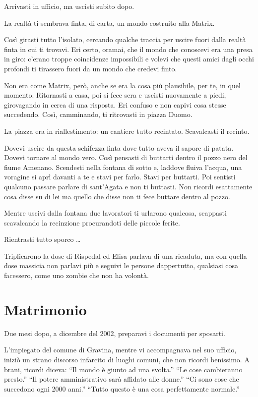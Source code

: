 Arrivasti in ufficio, ma uscisti subito dopo.

La realtà ti sembrava finta, di carta, un mondo costruito alla Matrix.

Così girasti tutto l'isolato, cercando qualche traccia per uscire fuori dalla realtà finta in cui ti trovavi. Eri certo, oramai, che il mondo che conoscevi era una presa in giro: c'erano troppe coincidenze impossibili e volevi che questi amici dagli occhi profondi ti tirassero fuori da un mondo che credevi finto.

Non era come Matrix, però, anche se era la cosa più plausibile, per te, in quel momento. Ritornasti a casa, poi si fece sera e uscisti nuovamente a piedi, girovagando in cerca di una risposta. Eri confuso e non capivi cosa stesse succedendo. Così, camminando, ti ritrovasti in piazza Duomo.

La piazza era in riallestimento: un cantiere tutto recintato. Scavalcasti il recinto.

Dovevi uscire da questa schifezza finta dove tutto aveva il sapore di patata. Dovevi tornare al mondo vero. Così pensasti di buttarti dentro il pozzo nero del fiume Amenano. Scendesti nella fontana di sotto e, laddove fluiva l'acqua, una voragine si aprì davanti a te e stavi per farlo. Stavi per buttarti. Poi sentisti qualcuno passare parlare di sant'Agata e non ti buttasti. Non ricordi esattamente cosa disse su di lei ma quello che disse non ti fece buttare dentro al pozzo.

Mentre uscivi dalla fontana due lavoratori ti urlarono qualcosa, scappasti scavalcando la recinzione procurandoti delle piccole ferite.

Rientrasti tutto sporco \ldots

Triplicarono la dose di Rispedal ed Elisa parlava di una ricaduta, ma con quella dose massicia non parlavi più e seguivi le persone dappertutto, qualsiasi cosa facessero, come uno zombie che non ha volontà.

\section{Matrimonio}
\label{matrimonio}

Due mesi dopo, a dicembre del 2002, preparavi i documenti per sposarti.

L'impiegato del comune di Gravina, mentre vi accompagnava nel suo ufficio, iniziò un strano discorso infarcito di luoghi comuni, che non ricordi benissimo. A brani, ricordi diceva: “Il mondo è giunto ad una svolta.” “Le cose cambieranno presto.” “Il potere amministrativo sarà affidato alle donne.” “Ci sono cose che succedono ogni 2000 anni.” “Tutto questo è una cosa perfettamente normale.”

